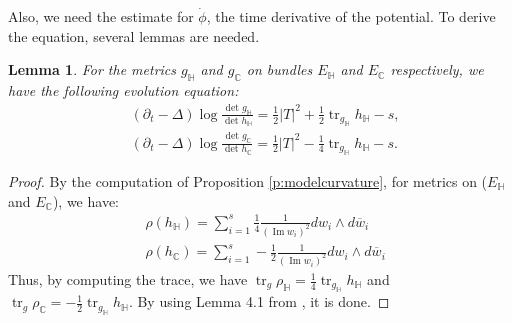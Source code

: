 \documentclass[12pt]{amsart}
\numberwithin{equation}{section}
\newtheorem{lemma}[prop]{Lemma}
\numberwithin{prop}{section}
\theoremstyle{definition}
\renewcommand{\bar}[1]{\overline{#1}}
\begin{document}
Also, we need the estimate for $\dot{\phi}$, the time derivative of the potential. To derive the equation, several lemmas are needed.
\begin{lemma}\label{l:split potential eq}
    For the metrics $g_\mathbb{H}$ and $g_\mathbb{C}$ on bundles $E_\mathbb{H}$ and $E_\mathbb{C}$ respectively, we have the following evolution equation:
    \begin{align}
        &(\partial_t -\Delta) \operatorname{log}\frac{\operatorname{det}g_{\mathbb{H}}}{\operatorname{det}h_{\mathbb{H}}} = \frac{1}{2}|T|^2 + \frac{1}{2}\operatorname{tr}_{g_\mathbb{H}}h_{\mathbb{H}} - s,\label{e:potential h}\\
        &(\partial_t -\Delta) \operatorname{log}\frac{\operatorname{det}g_{\mathbb{C}}}{\operatorname{det}h_{\mathbb{C}}} = \frac{1}{2}|T|^2 - \frac{1}{4}\operatorname{tr}_{g_\mathbb{H}}h_{\mathbb{H}} - s\label{e:potential c}.
    \end{align}
\end{lemma}
\begin{proof}
    By the computation of Proposition \ref{p:modelcurvature}, for metrics on ($E_\mathbb{H}$ and $E_\mathbb{C}$), we have:
    \begin{align*}
        &\rho(h_\mathbb{H}) = \sum_{i=1}^s\frac{1}{4}\frac{1}{(\operatorname{Im}w_i)^2}dw_i\wedge d\bar{w}_i\\
        &\rho(h_\mathbb{C}) = \sum_{i=1}^s-\frac{1}{2}\frac{1}{(\operatorname{Im}w_i)^2}dw_i\wedge d\bar{w}_i
    \end{align*}
    Thus, by computing the trace, we have $\operatorname{tr}_g \rho_\mathbb{H} = \frac{1}{4}\operatorname{tr}_{g_\mathbb{H}}h_\mathbb{H}$ and $\operatorname{tr}_g \rho_\mathbb{C} = -\frac{1}{2}\operatorname{tr}_{g_\mathbb{H}}h_\mathbb{H}$. By using Lemma 4.1 from \cite{StreetsSTB}, it is done.
\end{proof}
\end{document}
